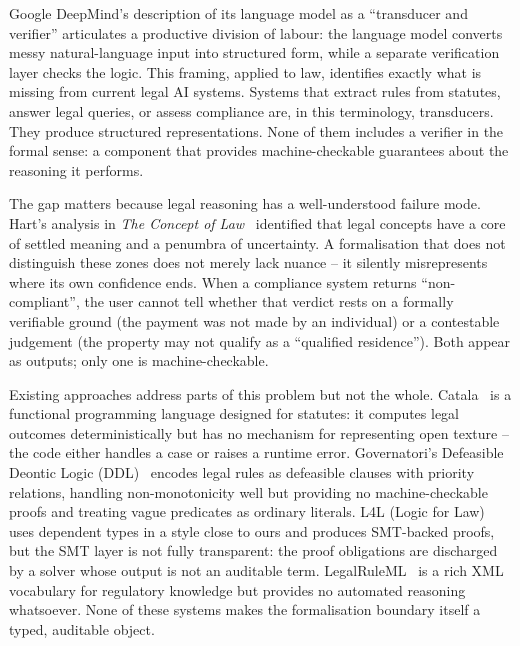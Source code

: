 \documentclass[runningheads]{llncs}
\begin{document}
Google DeepMind's description of its language model as a ``transducer and
verifier'' articulates a productive division of labour: the language model
converts messy natural-language input into structured form, while a separate
verification layer checks the logic. This framing, applied to law, identifies
exactly what is missing from current legal AI systems. Systems that extract
rules from statutes, answer legal queries, or assess compliance are, in this
terminology, transducers. They produce structured representations. None of them
includes a verifier in the formal sense: a component that provides
machine-checkable guarantees about the reasoning it performs.

The gap matters because legal reasoning has a well-understood failure mode.
Hart's analysis in \textit{The Concept of Law}~\cite{hart1961concept} identified
that legal concepts have a core of settled meaning and a penumbra of
uncertainty. A formalisation that does not distinguish these zones does not
merely lack nuance -- it silently misrepresents where its own confidence ends.
When a compliance system returns ``non-compliant'', the user cannot tell whether
that verdict rests on a formally verifiable ground (the payment was not made by
an individual) or a contestable judgement (the property may not qualify as a
``qualified residence''). Both appear as outputs; only one is machine-checkable.

Existing approaches address parts of this problem but not the whole. Catala~\cite{merigoux2021catala}
is a functional programming language designed for statutes: it computes legal
outcomes deterministically but has no mechanism for representing open texture --
the code either handles a case or raises a runtime error. Governatori's
Defeasible Deontic Logic (DDL)~\cite{governatori2005representing,governatori2019compliance}
encodes legal rules as defeasible clauses with priority relations, handling
non-monotonicity well but providing no machine-checkable proofs and treating
vague predicates as ordinary literals. L4L (Logic for Law)~\cite{hou2021l4l}
uses dependent types in a style close to ours and produces SMT-backed proofs,
but the SMT layer is not fully transparent: the proof obligations are discharged
by a solver whose output is not an auditable term. LegalRuleML~\cite{palmirani2018modelling}
is a rich XML vocabulary for regulatory knowledge but provides no automated
reasoning whatsoever. None of these systems makes the formalisation boundary
itself a typed, auditable object.
\end{document}
